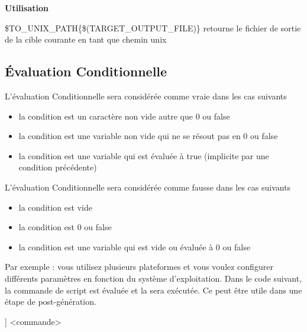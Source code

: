 \textbf{Utilisation}
\begin{codeentry}
\item[\$TO\_UNIX\_PATH\{\$(TARGET\_OUTPUT\_FILE)\}] retourne le fichier de sortie de la cible courante en tant que chemin unix
\end{codeentry}

\subsection{Évaluation Conditionnelle}


L'évaluation Conditionnelle sera considérée comme vraie dans les cas suivants

\begin{itemize}
\item la condition est un caractère non vide autre que 0 ou false
\item la condition est une variable non vide qui ne se résout pas en 0 ou false
\item la condition est une variable qui est évaluée à true (implicite par une condition précédente)
\end{itemize}

L'évaluation Conditionnelle sera considérée comme fausse dans les cas suivants

\begin{itemize}
\item la condition est vide
\item la condition est 0 ou false
\item la condition est une variable qui est vide ou évaluée à 0 ou false
\end{itemize}



Par exemple : vous utilisez plusieurs plateformes et vous voulez configurer différents paramètres en fonction du système d'exploitation. Dans le code suivant, la commande de script \codeline{[[ ]]} est évaluée et la  sera exécutée. Ce peut être utile dans une étape de post-génération.

\begin{code}
[[ if (PLATFORM ==  PLATFORM_MSW) { print (_T("cmd /c")); } else 
      { print (_T("sh ")); } ]] <commande>
\end{code}

